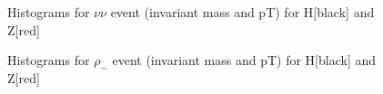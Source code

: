 \documentclass[10pt]{article}
\begin{document}
\begin{figure}[h] \centering
{}
\caption{Histograms for $\nu \nu$ event (invariant mass and pT) for H[black] and Z[red]}
\end{figure}
\begin{figure}[h] \centering
{}
\caption{Histograms for $\rho _-$ event (invariant mass and pT) for H[black] and Z[red]}
\end{figure}
\end{document}
